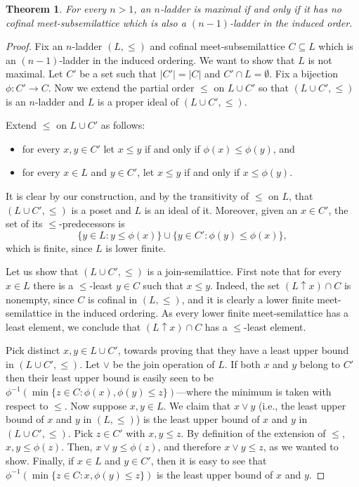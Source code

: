 \documentclass[]{amsart}
\newtheorem{theorem}{Theorem}[section]
\theoremstyle{definition}
\theoremstyle{remark}
\begin{document}
\begin{theorem}\label{thm:characterization}
For every $n > 1$, an $n$-ladder is maximal if and only if it has no cofinal meet-subsemilattice which is also a $(n-1)$-ladder in the induced order.
\end{theorem}
\begin{proof}
Fix an $n$-ladder $(L, \le)$ and cofinal meet-subsemilattice $C\subseteq L$ which is an $(n-1)$-ladder in the induced ordering. We want to show that $L$ is not maximal. Let $C'$ be a set such that $|C'| = |C|$ and $C' \cap L = \emptyset$. Fix a bijection $\phi: C' \rightarrow C$. Now we extend the partial order $\le$ on $L \cup C'$ so that $(L \cup C', \le)$ is an $n$-ladder and $L$ is a proper ideal of $(L\cup C', \le)$. 

Extend $\le$ on $L \cup C'$ as follows:
\begin{itemize}
\item for every $x,y \in C'$ let $x \le y$ if and only if $\phi(x) \le \phi(y)$, and
\item for every $x \in L$ and $y \in C'$, let $x \le y$ if and only if $x \le \phi(y)$.
\end{itemize}
It is clear by our construction, and by the transitivity of $\le$ on $L$, that $(L \cup C', \le)$ is a poset and $L$ is an ideal of it. Moreover, given an $x \in C'$, the set of its $\le$-predecessors is \[\{y \in L : y \le \phi(x)\} \cup \{y \in C' : \phi(y) \le \phi(x)\},\] which is finite, since $L$ is lower finite. 

Let us show that $(L \cup C', \le)$ is a join-semilattice. First note that for every $x \in L$ there is a $\le$-least $y \in C$ such that $x \le y$. Indeed, the set $(L \uparrow x) \cap C$ is nonempty, since $C$ is cofinal in $(L, \le)$, and it is clearly a lower finite meet-semilattice in the induced ordering. As every lower finite meet-semilattice has a least element, we conclude that $(L \uparrow x) \cap C$ has a $\le$-least element.


Pick distinct $x,y \in L \cup C'$, towards proving that they have a least upper bound in $(L \cup C', \le)$. Let $\vee$ be the join operation of $L$.  If both $x$ and $y$ belong to $C'$ then their least upper bound is easily seen to be $\phi^{-1}(\min\{z \in C : \phi(x), \phi(y) \le z\})$---where the minimum is taken with respect to $\le$. Now suppose $x, y \in L$. We claim that $x \vee y$ (i.e., the least upper bound of $x$ and $y$ in $(L, \le)$) is the least upper bound of $x$ and $y$ in $(L \cup C', \le)$. Pick $z \in C'$ with $x, y \le z$. By definition of the extension of $\le$, $x,y \le \phi(z)$. Then, $x \vee y \le \phi(z)$, and therefore $x \vee y \le z$, as we wanted to show. Finally, if $x \in L$ and $y \in C'$, then it is easy to see that $\phi^{-1}(\min\{z \in C: x, \phi(y) \le z\})$ is the least upper bound of $x$ and $y$. 


\end{proof}
\end{document}
